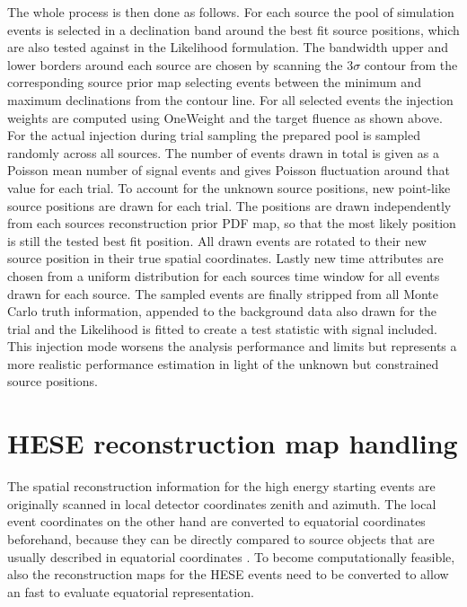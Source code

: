The whole process is then done as follows.
For each source the pool of simulation events is selected in a declination band around the best fit source positions, which are also tested against in the Likelihood formulation.
The bandwidth upper and lower borders around each source are chosen by scanning the $3\sigma$ contour from the corresponding source prior map selecting events between the minimum and maximum declinations from the contour line.
For all selected events the injection weights are computed using OneWeight and the target fluence as shown above.
For the actual injection during trial sampling the prepared pool is sampled randomly across all sources.
The number of events drawn in total is given as a Poisson mean number of signal events and gives Poisson fluctuation around that value for each trial.
To account for the unknown source positions, new point-like source positions are drawn for each trial.
The positions are drawn independently from each sources reconstruction prior PDF map, so that the most likely position is still the tested best fit position.
All drawn events are rotated to their new source position in their true spatial coordinates.
Lastly new time attributes are chosen from a uniform distribution for each sources time window for all events drawn for each source.
The sampled events are finally stripped from all Monte Carlo truth information, appended to the background data also drawn for the trial and the Likelihood is fitted to create a test statistic with signal included.
This injection mode worsens the analysis performance and limits but represents a more realistic performance estimation in light of the unknown but constrained source positions.


\section{HESE reconstruction map handling}
The spatial reconstruction information for the high energy starting events are originally scanned in local detector coordinates zenith and azimuth.
The local event coordinates on the other hand are converted to equatorial coordinates beforehand, because they can be directly compared to source objects that are  usually described in equatorial coordinates .
To become computationally feasible, also the reconstruction maps for the HESE events need to be converted to allow an fast to evaluate equatorial representation.

